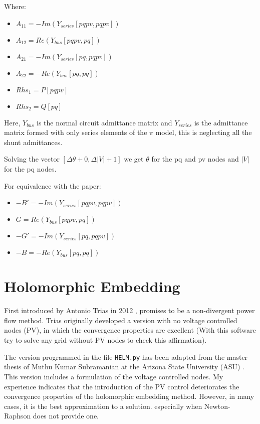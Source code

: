 \documentclass[11pt,fleqn]{book} %
\begin{document}
Where:
\begin{itemize}
	\item $A_{11} = -Im\left(Y_{series}[pqpv, pqpv]\right)$
	\item $A_{12} = Re\left(Y_{bus}[pqpv, pq]\right)$
	\item $A_{21} = -Im\left(Y_{series}[pq, pqpv]\right)$
	\item $A_{22} = -Re\left(Y_{bus}[pq, pq]\right)$
	\item $Rhs_1 = P[pqpv]$
	\item $Rhs_2 = Q[pq]$\newline
\end{itemize}

Here, $Y_{bus}$ is the normal circuit admittance matrix and $Y_{series}$ is the admittance matrix formed with only series elements of the $\pi$ model, this is neglecting all the shunt admittances.

Solving the vector $[\Delta \theta + 0, \Delta |V| + 1]$ we get $\theta$ for the pq and pv nodes and $|V|$ for the pq nodes.\newline

For equivalence with the paper:\newline

\begin{itemize}
	\item $-B' = -Im(Y_{series}[pqpv, pqpv])$
	\item $G = Re(Y_{bus}[pqpv, pq])$
	\item $-G' = -Im(Y_{series}[pq, pqpv])$
	\item $-B = -Re(Y_{bus}[pq, pq])$\newline
\end{itemize}

\newpage
\section{Holomorphic Embedding}

First introduced by Antonio Trias in 2012 \cite{TriasHELM}, promises to be a non-divergent power flow method. Trias originally developed a version with no voltage controlled nodes (PV), in which the convergence properties are excellent (With this software try to solve any grid without PV nodes to check this affirmation). 

The version programmed in the file \verb|HELM.py| has been adapted from the master thesis of Muthu Kumar Subramanian at the Arizona State University (ASU) \cite{subramanian2014application}. This version includes a formulation of the voltage controlled nodes. My experience indicates that the introduction of the PV control deteriorates the convergence properties of the holomorphic embedding method. However, in many cases, it is the best approximation to a solution. especially when Newton-Raphson does not provide one.
\end{document}
